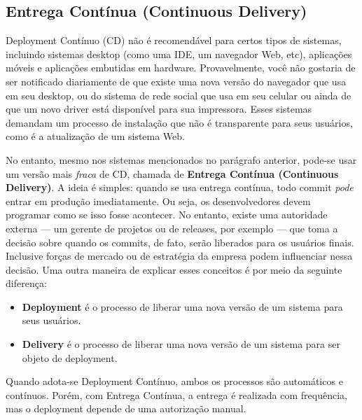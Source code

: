 \documentclass[
  11pt,
  twoside]{book}
\begin{document}
\hypertarget{entrega-contuxednua-continuous-delivery}{%
\subsection{Entrega Contínua (Continuous
Delivery)}\label{entrega-contuxednua-continuous-delivery}}

 

Deployment Contínuo (CD) não é recomendável para certos tipos de
sistemas, incluindo sistemas desktop (como uma IDE, um navegador Web,
etc), aplicações móveis e aplicações embutidas em hardware.
Provavelmente, você não gostaria de ser notificado diariamente de que
existe uma nova versão do navegador que usa em seu desktop, ou do
sistema de rede social que usa em seu celular ou ainda de que um novo
driver está disponível para sua impressora. Esses sistemas demandam um
processo de instalação que não é transparente para seus usuários, como é
a atualização de um sistema Web.

No entanto, mesmo nos sistemas mencionados no parágrafo anterior,
pode-se usar um versão mais \emph{fraca} de CD, chamada de
\textbf{Entrega Contínua (Continuous Delivery)}. A ideia é simples:
quando se usa entrega contínua, todo commit \emph{pode} entrar em
produção imediatamente. Ou seja, os desenvolvedores devem programar como
se isso fosse acontecer. No entanto, existe uma autoridade externa ---
um gerente de projetos ou de releases, por exemplo --- que toma a
decisão sobre quando os commits, de fato, serão liberados para os
usuários finais. Inclusive forças de mercado ou de estratégia da empresa
podem influenciar nessa decisão. Uma outra maneira de explicar esses
conceitos é por meio da seguinte diferença:

\begin{itemize}
\item
  \textbf{Deployment} é o processo de liberar uma nova versão de um
  sistema para seus usuários.
\item
  \textbf{Delivery} é o processo de liberar uma nova versão de um
  sistema para ser objeto de deployment.
\end{itemize}

Quando adota-se Deployment Contínuo, ambos os processos são automáticos
e contínuos. Porém, com Entrega Contínua, a entrega é realizada com
frequência, mas o deployment depende de uma autorização manual.

  
\end{document}
